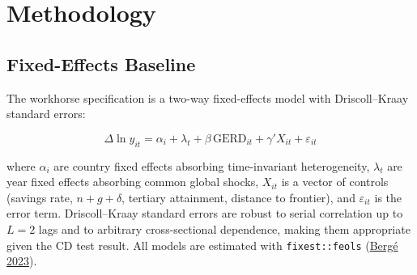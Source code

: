\documentclass[
  11pt,
]{article}
\begin{document}
\begin{table}[!h]
\centering
\caption{(\#tab:desc-table)Descriptive statistics, N=29 panel, 1998--2024.}
\centering
{}
\end{table}

\hypertarget{sec:method}{%
\section{Methodology}\label{sec:method}}

\hypertarget{fixed-effects-baseline}{%
\subsection{Fixed-Effects Baseline}\label{fixed-effects-baseline}}

The workhorse specification is a two-way fixed-effects model with Driscoll--Kraay standard errors:

\[\Delta \ln y_{it} = \alpha_i + \lambda_t + \beta\, \text{GERD}_{it} + \gamma' X_{it} + \varepsilon_{it}\]

where \(\alpha_i\) are country fixed effects absorbing time-invariant heterogeneity, \(\lambda_t\) are year fixed effects absorbing common global shocks, \(X_{it}\) is a vector of controls (savings rate, \(n + g + \delta\), tertiary attainment, distance to frontier), and \(\varepsilon_{it}\) is the error term. Driscoll--Kraay standard errors are robust to serial correlation up to \(L = 2\) lags and to arbitrary cross-sectional dependence, making them appropriate given the CD test result. All models are estimated with \texttt{fixest::feols} (\protect\hyperlink{ref-fixest2023}{Bergé 2023}).
\end{document}
